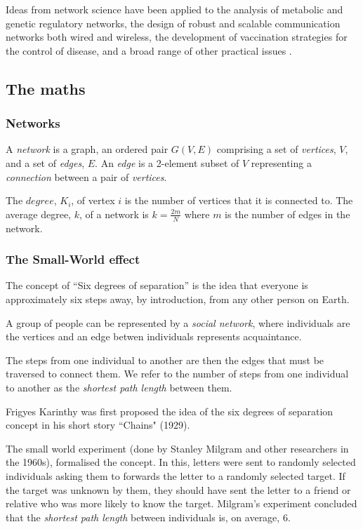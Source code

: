\documentclass[a4paper,11pt,titlepage]{article}
\begin{document}
Ideas from network science have been applied to the analysis of metabolic and
genetic regulatory networks, the design of robust and scalable communication
networks both wired and wireless, the development of vaccination strategies for
the control of disease, and a broad range of other practical
issues \cite{complexNets}.

\subsection{The maths}


\subsubsection{Networks}

A \emph{network} is a graph, an ordered pair $G(V,E)$ comprising a set of
\emph{vertices}, $V$, and a set of \emph{edges}, $E$. An \emph{edge} is a
2-element subset of $V$ representing a \emph{connection} between a pair of
\emph{vertices}.

The $degree$, $K_i$, of vertex $i$ is the number of vertices that it is
connected to. The average degree, $k$, of a network is $k =\frac{2m}{N}$ where
$m$ is the number of edges in the network.

\subsubsection{The Small-World effect}

The concept of ``Six degrees of separation'' is the idea that everyone is
approximately six steps away, by introduction, from any other person on Earth.

A group of people can be represented by a \emph{social network}, where
individuals are the vertices and an edge betwen individuals represents
acquaintance.

The steps from one individual to another are then the edges that must be
traversed to connect them. We refer to the number of steps from one individual
to another as the \emph{shortest path length} between them.

Frigyes Karinthy was first proposed the idea of the six degrees of separation
concept in his short story ``Chains" (1929).

The small world experiment (done by Stanley Milgram and other researchers in the
1960s), formalised the concept. In this, letters were sent to randomly selected
individuals asking them to forwards the letter to a randomly selected target. If
the target was unknown by them, they should have sent the letter to a friend or
relative who was more likely to know the target. Milgram's experiment concluded
that the \emph{shortest path length} between individuals is, on average, $6$.
\end{document}
